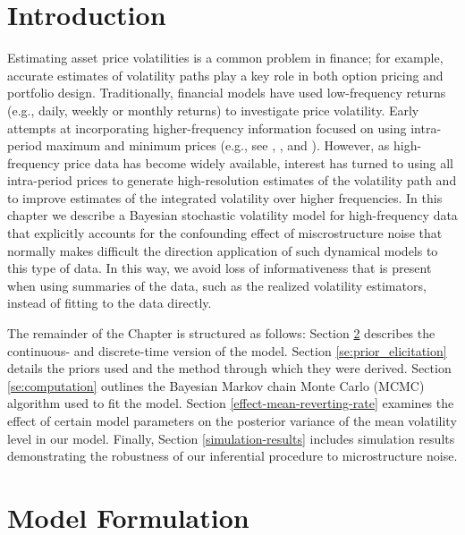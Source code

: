 \label{ch:sv-high-freq}

\section{Introduction}\label{se:introduction}

Estimating asset price volatilities is a common problem in finance; for example, accurate estimates of volatility paths play a key role in both option pricing and portfolio design.  Traditionally, financial models have used low-frequency returns (e.g., daily, weekly or monthly returns) to investigate price volatility.  Early attempts at incorporating higher-frequency information focused on using intra-period maximum and minimum prices (e.g., see \cite{alizadeh2002range}, \cite{brandt2003no-arb}, and \cite{chou2010range}).  However, as high-frequency price data has become widely available, interest has turned to using all intra-period prices to generate high-resolution estimates of the volatility path and to improve estimates of the integrated volatility over higher frequencies. In this chapter we describe a Bayesian stochastic volatility model for high-frequency data that explicitly accounts for the confounding effect of miscrostructure noise that normally makes difficult the direction application of such dynamical models to this type of data. In this way, we avoid loss of informativeness that is present when using summaries of the data, such as the realized volatility estimators, instead of fitting to the data directly.

The remainder of the Chapter is structured as follows:  Section \ref{se:model_formulation} describes the continuous- and discrete-time version of the model. Section \ref{se:prior_elicitation} details the priors used and the method through which they were derived. Section \ref{se:computation} outlines the Bayesian Markov chain Monte Carlo (MCMC) algorithm used to fit the model. Section \ref{effect-mean-reverting-rate} examines the effect of certain model parameters on the posterior variance of the mean volatility level in our model. Finally, Section \ref{simulation-results} includes simulation results demonstrating the robustness of our inferential procedure to microstructure noise.

\section{Model Formulation}\label{se:model_formulation}

